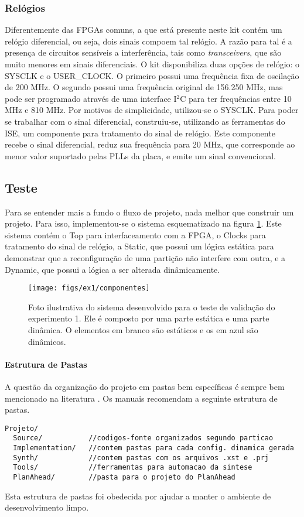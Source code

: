 \documentclass[11pt,a4paper,oneside]{book}
\begin{document}
\subsubsection{Relógios}
Diferentemente das FPGAs comuns, a que está presente neste kit contém um relógio diferencial, ou seja, dois sinais compoem tal relógio.
A razão para tal é a presença de circuitos sensíveis a interferência, tais como \textit{transceivers}, que são muito menores em sinais diferenciais.
O kit disponibiliza duas opções de relógio: o SYSCLK e o USER\_CLOCK.
O primeiro possui uma frequência fixa de oscilação de 200 MHz.
O segundo possui uma frequência original de 156.250 MHz, mas pode ser programado através de uma interface I$^2$C para ter frequências entre 10 MHz e 810 MHz.
Por motivos de simplicidade, utilizou-se o SYSCLK.
Para poder se trabalhar com o sinal diferencial, construiu-se, utilizando as ferramentas do ISE, um componente para tratamento do sinal de relógio.
Este componente recebe o sinal diferencial, reduz sua frequência para 20 MHz, que corresponde ao menor valor suportado pelas PLLs da placa, e emite um sinal convencional.

\subsection{Teste}
Para se entender mais a fundo o fluxo de projeto, nada melhor que construir um projeto.
Para isso, implementou-se o sistema esquematizado na figura \ref{fig:ex1:componentes}.
Este sistema contém o \dlq{}Top\drq{} para interfaceamento com a FPGA, o \dlq{}Clocks\drq{} para tratamento do sinal de relógio, a \dlq{}Static\drq{}, que possui um lógica estática para demonstrar que a reconfiguração de uma partição não interfere com outra, e a \dlq{}Dynamic\drq{}, que possui a lógica a ser alterada dinâmicamente.

\begin{figure}[h]
\centering
\texttt{[image: figs/ex1/componentes]}
\caption{Foto ilustrativa do sistema desenvolvido para o teste de validação do experimento 1. Ele é composto por uma parte estática e uma parte dinâmica. O elementos em branco são estáticos e os em azul são dinâmicos.}
\label{fig:ex1:componentes}
\end{figure}

\paragraph{Estrutura de Pastas}
A questão da organização do projeto em pastas bem específicas é sempre bem mencionado na literatura \cite{ug702, ug743, ug744}.
Os manuais recomendam a seguinte estrutura de pastas.
\begin{lstlisting}
Projeto/
  Source/           //codigos-fonte organizados segundo particao
  Implementation/   //contem pastas para cada config. dinamica gerada
  Synth/            //contem pastas com os arquivos .xst e .prj
  Tools/            //ferramentas para automacao da sintese
  PlanAhead/        //pasta para o projeto do PlanAhead
\end{lstlisting}
Esta estrutura de pastas foi obedecida por ajudar a manter o ambiente de desenvolvimento limpo.
\end{document}
